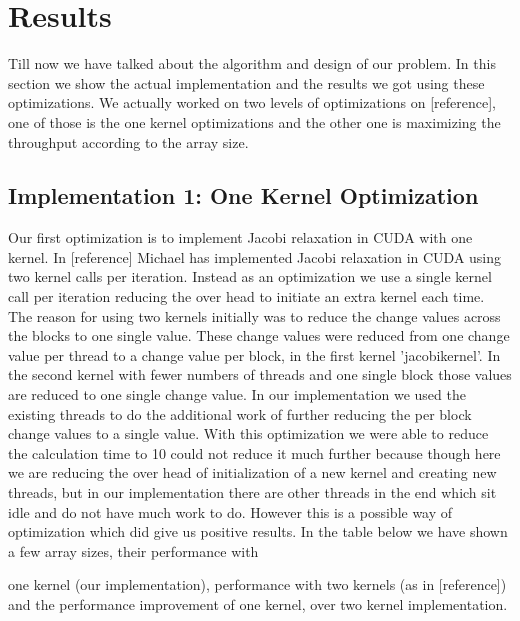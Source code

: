 \documentclass[11pt, twocolumn]{article}
\begin{document}
\section{Results} %
Till now we have talked about the algorithm and design of our problem. In this section we show the
actual implementation and the results we got using these optimizations. We actually worked on two
levels of optimizations on [reference], one of those is the one kernel optimizations and the other one is
maximizing the throughput according to the array size.
    \subsection{Implementation 1: One Kernel Optimization}
    Our first optimization is to implement Jacobi relaxation in CUDA with one kernel. In [reference]
    Michael has implemented Jacobi relaxation in CUDA using two kernel calls per iteration. Instead as an
    optimization we use a single kernel call per iteration reducing the over head to initiate an extra kernel
    each time. The reason for using two kernels initially was to reduce the change values across the blocks
    to one single value. These change values were reduced from one change value per thread to a change
    value per block, in the first kernel 'jacobikernel'. In the second kernel with fewer numbers of threads
    and one single block those values are reduced to one single change value. In our implementation we
    used the existing threads to do the additional work of further reducing the per block change values to
    a single value. With this optimization we were able to reduce the calculation time to 10%
    could not reduce it much further because though here we are reducing the over head of initialization of
    a new kernel and creating new threads, but in our implementation there are other threads in the end
    which sit idle and do not have much work to do. However this is a possible way of optimization which
    did give us positive results. In the table below we have shown a few array sizes, their performance with

    one kernel (our implementation), performance with two kernels (as in [reference]) and the performance
    improvement of one kernel, over two kernel implementation.
\end{document}
